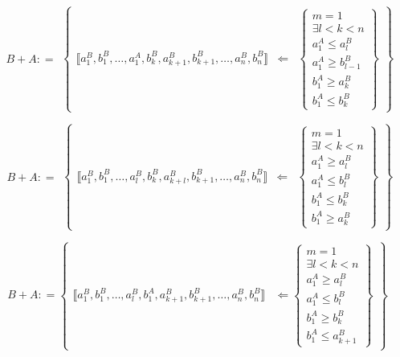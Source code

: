 \begin{enumerate}
  \[\begin{matrix}
  {{B + A}{: =}}
  \end{matrix}\begin{Bmatrix}
  {⟦{{a_{1}^{B},b_{1}^{B}},\ldots,{a_{1}^{A},b_{k}^{B}},{a_{k + 1}^{B},b_{k + 1}^{B}},\ldots,{a_{n}^{B},b_{n}^{B}}}⟧} & \Leftarrow & \begin{Bmatrix}
  {m = 1} \\
  {\exists{{l < k} < n}} \\
  {a_{1}^{A} \leq a_{l}^{B}} \\
  {a_{1}^{A} \geq b_{l - 1}^{B}} \\
  {b_{1}^{A} \geq a_{k}^{B}} \\
  {b_{1}^{A} \leq b_{k}^{B}}
  \end{Bmatrix}
  \end{Bmatrix}\]

  \[\begin{matrix}
  {{B + A}{: =}}
  \end{matrix}\begin{Bmatrix}
  {⟦{{a_{1}^{B},b_{1}^{B}},\ldots,{a_{l}^{B},b_{k}^{B}},{a_{k + l}^{B},b_{k + 1}^{B}},\ldots,{a_{n}^{B},b_{n}^{B}}}⟧} & \Leftarrow & \begin{Bmatrix}
  {m = 1} \\
  {\exists{{l < k} < n}} \\
  {a_{1}^{A} \geq a_{l}^{B}} \\
  {a_{1}^{A} \leq b_{l}^{B}} \\
  {b_{1}^{A} \leq b_{k}^{B}} \\
  {b_{1}^{A} \geq a_{k}^{B}}
  \end{Bmatrix}
  \end{Bmatrix}\]

  \[{{B + A}{: =}}\begin{Bmatrix}
  {⟦{{a_{1}^{B},b_{1}^{B}},\ldots,{a_{l}^{B},b_{1}^{A}},{a_{k + 1}^{B},b_{k + 1}^{B}},\ldots,{a_{n}^{B},b_{n}^{B}}}⟧} & {\Leftarrow\begin{Bmatrix}
  {m = 1} \\
  {\exists{{l < k} < n}} \\
  {a_{1}^{A} \geq a_{l}^{B}} \\
  {a_{1}^{A} \leq b_{l}^{B}} \\
  {b_{1}^{A} \geq b_{k}^{B}} \\
  {b_{1}^{A} \leq a_{k + 1}^{B}}
  \end{Bmatrix}}
  \end{Bmatrix}\]
\end{enumerate}

